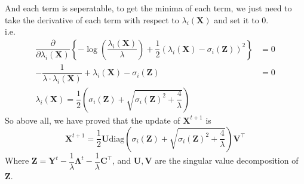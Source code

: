 And each term is seperatable, to get the minima of each term, we just need to take the derivative of each term with respect to $\lambda_i(\mathbf{X})$ and set it to $0$.\\
i.e.
\begin{align*}
\dfrac{\partial}{\partial \lambda_i(\mathbf{X})}\left\{-\log\left(\dfrac{\lambda_i(\mathbf{X})}{\lambda}\right)+\dfrac{1}{2}(\lambda_i(\mathbf{X})-\sigma_i(\mathbf{Z}))^2\right\} &= 0 \\
-\dfrac{1}{\lambda\cdot \lambda_i(\mathbf{X})}+\lambda_i(\mathbf{X})-\sigma_i(\mathbf{Z}) &= 0 \\
\lambda_i(\mathbf{X}) = \dfrac{1}{2}\left(\sigma_i(\mathbf{Z}) + \sqrt{\sigma_i(\mathbf{Z})^2 + \dfrac{4}{\lambda}}\right)
\end{align*}
So above all, we have proved that the update of $\mathbf{X}^{t+1}$ is
$$\mathbf{X}^{t+1}=\dfrac{1}{2}\mathbf{U}\text{diag}\left(\sigma_i(\mathbf{Z}) + \sqrt{\sigma_i(\mathbf{Z})^2 + \dfrac{4}{\lambda}}\right)\mathbf{V}^{\top}$$
Where $\mathbf{Z}= \mathbf{Y}^t-\dfrac{1}{\lambda}\mathbf{\Lambda}^t-\dfrac{1}{\lambda}\mathbf{C^{\top}}$, and $\mathbf{U},\mathbf{V}$ are the singular value decomposition of $\mathbf{Z}$.\\


